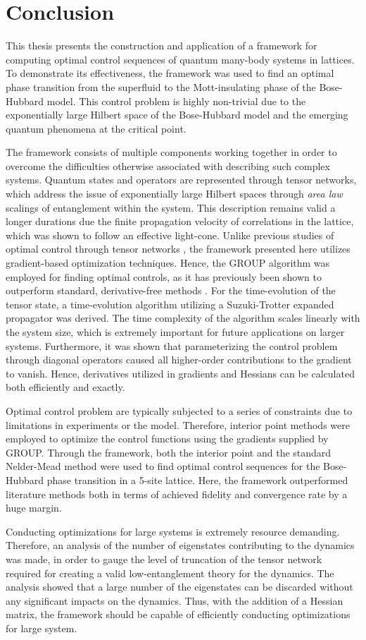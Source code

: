 \chapter{Conclusion}

This thesis presents the construction and application of a framework for computing optimal control sequences of quantum many-body systems in lattices. To demonstrate its effectiveness, the framework was used to find an optimal phase transition from the superfluid to the Mott-insulating phase of the Bose-Hubbard model. This control problem is highly non-trivial due to the exponentially large Hilbert space of the Bose-Hubbard model and the emerging quantum phenomena at the critical point.

The framework consists of multiple components working together in order to overcome the difficulties otherwise associated with describing such complex systems. 
Quantum states and operators are represented through tensor networks, which address the issue of exponentially large Hilbert spaces through \textit{area law} scalings of entanglement within the system. 
This description remains valid a longer durations due the finite propagation velocity of correlations in the lattice, which was shown to follow an effective light-cone.
Unlike previous studies of optimal control through tensor networks \cite{Doria2011,FrankBloch}, the framework presented here utilizes gradient-based optimization techniques.
Hence, the GROUP algorithm was employed for finding optimal controls, as it has previously been shown to outperform standard, derivative-free methods \cite{sorensen2018}.
For the time-evolution of the tensor state, a time-evolution algorithm utilizing a Suzuki-Trotter expanded propagator was derived. The time complexity of the algorithm scales linearly with the system size, which is extremely important for future applications on larger systems. Furthermore, it was shown that parameterizing the control problem through diagonal operators caused all higher-order contributions to the gradient to vanish. Hence, derivatives utilized in gradients and Hessians can be calculated both efficiently and exactly.

Optimal control problem are typically subjected to a series of constraints due to limitations in experiments or the model. Therefore, interior point methods were employed to optimize the control functions using the gradients supplied by GROUP. 
Through the framework, both the interior point and the standard Nelder-Mead method were used to find optimal control sequences for the Bose-Hubbard phase transition in a 5-site lattice. Here, the framework outperformed literature methods both in terms of achieved fidelity and convergence rate by a huge margin. 

Conducting optimizations for large systems is extremely resource demanding. Therefore, an analysis of the number of eigenstates contributing to the dynamics was made, in order to gauge the level of truncation of the tensor network required for creating a valid low-entanglement theory for the dynamics.
The analysis showed that a large number of the eigenstates can be discarded without any significant impacts on the dynamics.
Thus, with the addition of a Hessian matrix, the framework should be capable of efficiently conducting optimizations for large system.